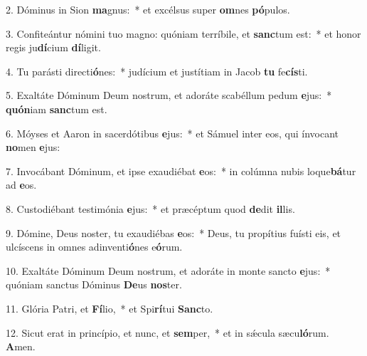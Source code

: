 2. Dóminus in Sion \textbf{ma}gnus:~*  et excélsus super \textbf{om}nes \textbf{pó}pulos.\

3. Confiteántur nómini tuo magno: quóniam terríbile, et \textbf{sanc}tum est:~*  et honor regis ju\textbf{dí}cium \textbf{dí}ligit.\

4. Tu parásti directi\textbf{ó}nes:~*  judícium et justítiam in Jacob \textbf{tu} fe\textbf{cís}ti.\

5. Exaltáte Dóminum Deum nostrum, et adoráte scabéllum pedum \textbf{e}jus:~*  \textbf{quón}iam \textbf{sanc}tum est.\

6. Móyses et Aaron in sacerdótibus \textbf{e}jus:~*  et Sámuel inter eos, qui ínvocant \textbf{no}men \textbf{e}jus:\

7. Invocábant Dóminum, et ipse exaudiébat \textbf{e}os:~*  in colúmna nubis loque\textbf{bá}tur ad \textbf{e}os.\

8. Custodiébant testimónia \textbf{e}jus:~*  et præcéptum quod \textbf{de}dit \textbf{il}lis.\

9. Dómine, Deus noster, tu exaudiébas \textbf{e}os:~*  Deus, tu propítius fuísti eis, et ulcíscens in omnes adinventi\textbf{ó}nes e\textbf{ó}rum.\

10. Exaltáte Dóminum Deum nostrum, et adoráte in monte sancto \textbf{e}jus:~*  quóniam sanctus Dóminus \textbf{De}us \textbf{nos}ter.\

11. Glória Patri, et \textbf{Fí}lio,~*  et Spi\textbf{rí}tui \textbf{Sanc}to.\

12. Sicut erat in princípio, et nunc, et \textbf{sem}per,~*  et in sǽcula sæcu\textbf{ló}rum. \textbf{A}men.\

